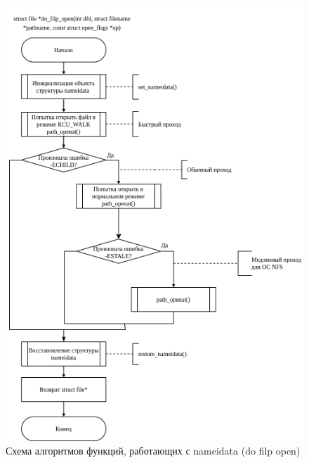 \begin{figure}[H]
	\centering
	\includegraphics[scale=0.8]{assets/open-do_filp_open.drawio.png}
	\caption{Схема алгоритмов функций, работающих с nameidata (do filp open)}
\end{figure}

